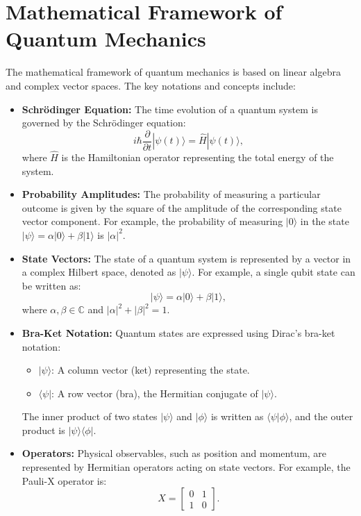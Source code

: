 \documentclass[12pt,a4paper]{report}
\begin{document}
\section{Mathematical Framework of Quantum Mechanics}
The mathematical framework of quantum mechanics is based on linear algebra and complex vector spaces. The key notations and concepts include:
\begin{itemize}

    \item \textbf{Schrödinger Equation:} The time evolution of a quantum system is governed by the Schrödinger equation:
    \[
    i\hbar \frac{\partial}{\partial t} |\psi(t)\rangle = \hat{H} |\psi(t)\rangle,
    \]
    where \( \hat{H} \) is the Hamiltonian operator representing the total energy of the system.

    \item \textbf{Probability Amplitudes:} The probability of measuring a particular outcome is given by the square of the amplitude of the corresponding state vector component. For example, the probability of measuring \( |0\rangle \) in the state \( |\psi\rangle = \alpha |0\rangle + \beta |1\rangle \) is \( |\alpha|^2 \).
    
    \item \textbf{State Vectors:} The state of a quantum system is represented by a vector in a complex Hilbert space, denoted as \( |\psi\rangle \). For example, a single qubit state can be written as:
    \[
    |\psi\rangle = \alpha |0\rangle + \beta |1\rangle,
    \]
    where \( \alpha, \beta \in \mathbb{C} \) and \( |\alpha|^2 + |\beta|^2 = 1 \).

    \item \textbf{Bra-Ket Notation:} Quantum states are expressed using Dirac's bra-ket notation:
    \begin{itemize}
        \item \( |\psi\rangle \): A column vector (ket) representing the state.
        \item \( \langle\psi| \): A row vector (bra), the Hermitian conjugate of \( |\psi\rangle \).
    \end{itemize}
    The inner product of two states \( |\psi\rangle \) and \( |\phi\rangle \) is written as \( \langle\psi|\phi\rangle \), and the outer product is \( |\psi\rangle\langle\phi| \).

    \item \textbf{Operators:} Physical observables, such as position and momentum, are represented by Hermitian operators acting on state vectors. For example, the Pauli-X operator is:
    \[
    X = \begin{bmatrix}
    0 & 1 \\
    1 & 0
    \end{bmatrix}.
    \]


\end{itemize}
\end{document}
